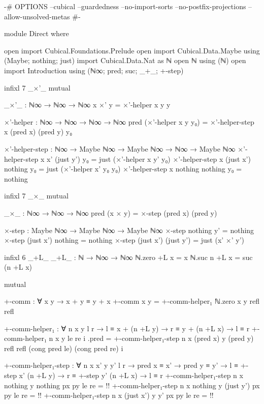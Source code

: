 \begin{code}[hide]
{-# OPTIONS --cubical --guardedness --no-import-sorts --no-postfix-projections --allow-unsolved-metas #-}

module Direct where

open import Cubical.Foundations.Prelude
open import Cubical.Data.Maybe using (Maybe; nothing; just)
import Cubical.Data.Nat as ℕ
open ℕ using (ℕ)
open import Introduction using (ℕ∞; pred; suc; _+_; +-step)
\end{code}
\begin{code}[hide]
infixl 7 _×'_
mutual
\end{code}
\begin{code}
  _×'_ : ℕ∞ → ℕ∞ → ℕ∞
  x ×' y = ×'-helper x y y

  ×'-helper : ℕ∞ → ℕ∞ → ℕ∞ → ℕ∞
  pred (×'-helper x y y₀) =
    ×'-helper-step x (pred x) (pred y) y₀

  ×'-helper-step :
    ℕ∞ → Maybe ℕ∞ → Maybe ℕ∞ → ℕ∞ →
    Maybe ℕ∞
  ×'-helper-step x x' (just y') y₀ =
    just (×'-helper x y' y₀)
  ×'-helper-step x (just x') nothing y₀ =
    just (×'-helper x' y₀ y₀)
  ×'-helper-step x nothing nothing y₀ =
    nothing
\end{code}

\begin{code}[hide]
infixl 7 _×_
mutual
\end{code}
\begin{code}
  _×_ : ℕ∞ → ℕ∞ → ℕ∞
  pred (x × y) = ×-step (pred x) (pred y)

  ×-step : Maybe ℕ∞ → Maybe ℕ∞ → Maybe ℕ∞
  ×-step nothing    y'         = nothing
  ×-step (just x')  nothing    = nothing
  ×-step (just x')  (just y')  = just (x' ×' y')
\end{code}

\begin{code}
infixl 6 _+L_
_+L_ : ℕ → ℕ∞ → ℕ∞
ℕ.zero +L x = x
ℕ.suc n +L x = suc (n +L x)
\end{code}

\begin{code}[hide]
mutual
\end{code}
\begin{code}
  +-comm : ∀ x y → x + y ≡ y + x
  +-comm x y = +-comm-helper₁ ℕ.zero x y refl refl

  +-comm-helper₁ :
    ∀ n x y {l r} → l ≡ x + (n +L y) → r ≡ y + (n +L x) → l ≡ r
  +-comm-helper₁ n x y le re i .pred =
    +-comm-helper₁-step n x (pred x) y (pred y)
      refl refl (cong pred le) (cong pred re) i

  +-comm-helper₁-step :
    ∀ n x x' y y' {l r} →
    pred x ≡ x' → pred y ≡ y' →
    l ≡ +-step x' (n +L y) → r ≡ +-step y' (n +L x) →
    l ≡ r
  +-comm-helper₁-step n x nothing y nothing px py le re = {!!}
  +-comm-helper₁-step n x nothing y (just y') px py le re = {!!}
  +-comm-helper₁-step n x (just x') y y' px py le re = {!!}
\end{code}
